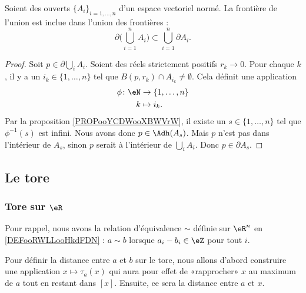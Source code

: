 \begin{proposition}	\label{PROPooEZETooTNStnO}
	Soient des ouverts \( \{ A_i \}_{i=1,\ldots,n}\) d'un espace vectoriel normé. La frontière de l'union est inclue dans l'union des frontières :
	\begin{equation}
		\partial\big( \bigcup_{i=1}^nA_i \big)\subset\bigcup_{i=1}^n\partial A_i.
	\end{equation}
\end{proposition}


\begin{proof}
	Soit \( p\in \partial\bigcup_iA_i\). Soient des réels strictement positifs \( r_k\to 0\). Pour chaque \( k\), il y a un \( i_k\in \{ 1,\ldots,n \}\) tel que \( B(p,r_k)\cap A_{i_k}\neq \emptyset\). Cela définit une application
	\begin{equation}
		\begin{aligned}
			\phi\colon \eN & \to \{ 1,\ldots,n \} \\
			k              & \mapsto i_k.
		\end{aligned}
	\end{equation}
	Par la proposition \ref{PROPooYCDWooXBWVrW}, il existe un \( s\in\{ 1,\ldots,n \}\) tel que \( \phi^{-1}(s)\) est infini. Nous avons donc \( p\in\Adh(A_s)\). Mais \( p\) n'est pas dans l'intérieur de \( A_s\), sinon \( p\) serait à l'intérieur de \( \bigcup_iA_i\). Donc \( p\in\partial A_s\).
\end{proof}

\subsection{Le tore}

\subsubsection{Tore sur \( \eR\)}

Pour rappel, nous avons la relation d'équivalence \( \sim\) définie sur \( \eR^n\) en \ref{DEFooRWLLooHkdFDN} : \( a\sim b\) lorsque \( a_i-b_i\in \eZ\) pour tout \( i\).

Pour définir la distance entre \( a\) et \( b\) sur le tore, nous allons d'abord construire une application \(x\mapsto \tau_a(x)\) qui aura pour effet de «rapprocher» \( x\) au maximum de \( a\) tout en restant dans \( [x]\). Ensuite, ce sera la distance entre \( a\) et \( x\).

